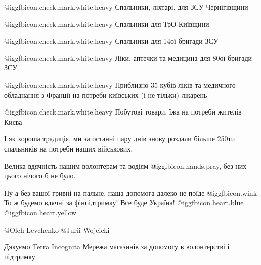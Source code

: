 @igg{fbicon.check.mark.white.heavy}  Спальники, ліхтарі, для ЗСУ Чернігівщини

@igg{fbicon.check.mark.white.heavy}  Спальники для ТрО Київщини 

@igg{fbicon.check.mark.white.heavy}  Спальники для 14ої бригади ЗСУ

@igg{fbicon.check.mark.white.heavy}  Ліки, аптечки та медицина для 80ої бригади
ЗСУ

@igg{fbicon.check.mark.white.heavy}  Приблизно 35 кубів ліків та медичного
обладнання з Франції на потреби київських (і не тільки) лікарень

@igg{fbicon.check.mark.white.heavy}  Побутові товари, їжа на потреби жителів Києва


І як хороша традиція, ми за останні пару днів знову роздали більше 250ти
спальників на потреби наших військових.

Велика вдячність нашим волонтерам та водіям @igg{fbicon.hands.pray}, без них цього нічого б не було.

Ну а без вашої гривні на пальне, наша допомога далеко не поїде @igg{fbicon.wink} То ж будемо
вдячні за фінпідтримку! Все буде Україна! @igg{fbicon.heart.blue}  @igg{fbicon.heart.yellow} 

@Oleh Levchenko @Jurii Wojcicki

Дякуємо \href{https://www.facebook.com/TerraIncognitaUA}{Terra Incognita Мережа
магазинів} за допомогу в волонтерстві і підтримку.
